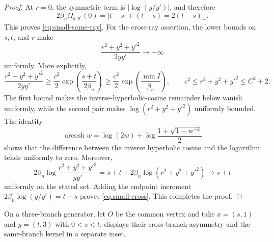 \documentclass[10pt,a4paper]{amsart}
\numberwithin{equation}{section}
\DeclareMathOperator{\arcosh}{arcosh}
\begin{document}
\begin{proof}
At $r=0$, the symmetric term is $|\log(y/y')|$, and therefore
\[ 2\beta_n\Omega_{y,y'}(0)=|t-s|+(t-s)=2(t-s)_+. \]
This proves \eqref{eq:small-same-ray}.  For the cross-ray assertion, the lower bounds on $s,t$, and $r$ make
\[ \frac{r^2+y^2+y'^2}{2yy'}\longrightarrow+\infty \]
uniformly.  More explicitly,
\[ \frac{r^2+y^2+y'^2}{2yy'} \ge\frac{c^2}{2}\exp\left(\frac{s+t}{2\beta_n}\right) \ge\frac{c^2}{2}\exp\left(\frac{\min I}{\beta_n}\right), \qquad c^2\le r^2+y^2+y'^2\le C^2+2. \]
The first bound makes the inverse-hyperbolic-cosine remainder below vanish uniformly, while the second pair makes $\log(r^2+y^2+y'^2)$ uniformly bounded.  The identity
\[ \arcosh w=\log(2w)+ \log\frac{1+\sqrt{1-w^{-2}}}{2} \]
shows that the difference between the inverse hyperbolic cosine and the logarithm tends uniformly to zero.  Moreover,
\[ 2\beta_n\log\frac{r^2+y^2+y'^2}{yy'} =s+t+2\beta_n\log(r^2+y^2+y'^2) \longrightarrow s+t \]
uniformly on the stated set.  Adding the endpoint increment
$2\beta_n\log(y/y')=t-s$ proves \eqref{eq:small-cross}.
	This completes the proof.
\end{proof}

On a three-branch generator, let $O$ be the common vertex and take $x=(s,1)$ and $y=(t,3)$ with $0<s<t$.   displays their cross-branch asymmetry and the same-branch kernel in a separate inset.
\end{document}
